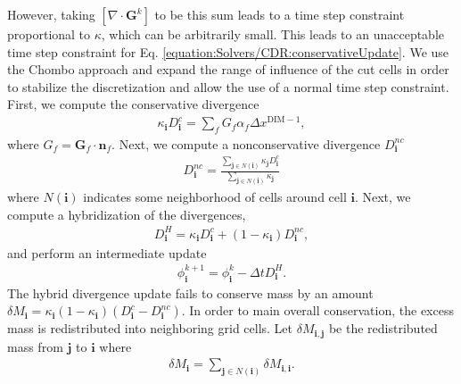 \documentclass[letterpaper,10pt,english]{sphinxmanual}
\begin{document}
However, taking \([\nabla\cdot\mathbf{G}^k]\) to be this sum leads to a time step constraint proportional to \(\kappa\), which can be arbitrarily small.
This leads to an unacceptable time step constraint for Eq. \ref{equation:Solvers/CDR:conservativeUpdate}.
We use the Chombo approach and expand the range of influence of the cut cells in order to stabilize the discretization and allow the use of a normal time step constraint.
First, we compute the conservative divergence
\begin{equation*}
\begin{split}\kappa_{\mathbf{i}} D_\mathbf{i}^c =  \sum_f G_f\alpha_f\Delta x^{\textrm{DIM} -1},\end{split}
\end{equation*}
where \(G_f = \mathbf{G}_f\cdot \mathbf{n}_f\). Next, we compute a non\sphinxhyphen{}conservative divergence \(D_{\mathbf{i}}^{nc}\)
\begin{equation*}
\begin{split}D_\mathbf{i}^{nc} =  \frac{\sum_{\mathbf{j}\in{N}\left(\mathbf{i}\right)}\kappa_{\mathbf{j}}D_\mathbf{i}^c}{\sum_{\mathbf{j}\in{N}\left(\mathbf{i}\right)}\kappa_{\mathbf{j}}}\end{split}
\end{equation*}
where \(N(\mathbf{i})\) indicates some neighborhood of cells around cell \(\mathbf{i}\). Next, we compute a hybridization of the divergences,
\begin{equation*}
\begin{split}D_{\mathbf{i}}^H = \kappa_{\mathbf{i}} D_{\mathbf{i}}^c + (1-\kappa_{\mathbf{i}})D_{\mathbf{i}}^{nc},\end{split}
\end{equation*}
and perform an intermediate update
\begin{equation*}
\begin{split}\phi_{\mathbf{i}}^{k+1} = \phi_{\mathbf{i}}^k - \Delta tD_{\mathbf{i}}^H.\end{split}
\end{equation*}
The hybrid divergence update fails to conserve mass by an amount \(\delta M_{\mathbf{i}} = \kappa_{\mathbf{i}}\left(1-\kappa_{\mathbf{i}}\right)\left(D_{\mathbf{i}}^c - D_{\mathbf{i}}^{nc}\right)\).
In order to main overall conservation, the excess mass is redistributed into neighboring grid cells.
Let \(\delta M_{\mathbf{i}, \mathbf{j}}\) be the redistributed mass from \(\mathbf{j}\) to \(\mathbf{i}\) where
\begin{equation*}
\begin{split}\delta M_{\mathbf{i}} = \sum_{\mathbf{j} \in N(\mathbf{i})}\delta M_{\mathbf{i}, \mathbf{i}}.\end{split}
\end{equation*}
\end{document}
